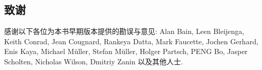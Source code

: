 \subsection*{致谢}
感谢以下各位为本书早期版本提供的勘误与意见: Alan Bain, Leen Bleijenga, Keith Conrad, Jean Cougnard, Rankeya Datta, Mark Faucette, Jochen Gerhard, Enis Kaya, Michael M\u{u}ller, Stefan M\u{u}ller, Holger Partsch, PENG Bo, Jasper Scholten, Nicholas Wilson, Dmitriy Zanin 以及其他人士.
